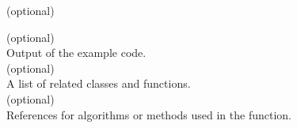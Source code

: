 \noindent
[{\bf Example}] (optional)
{\footnotesize}
 
\noindent
[{\bf Output}] (optional)\\
Output of the example code.\\
 
 (optional)\\
A list of related classes and functions.\\
 
\noindent
[{\bf References}] (optional)\\
References for algorithms or methods used in the function.\\
